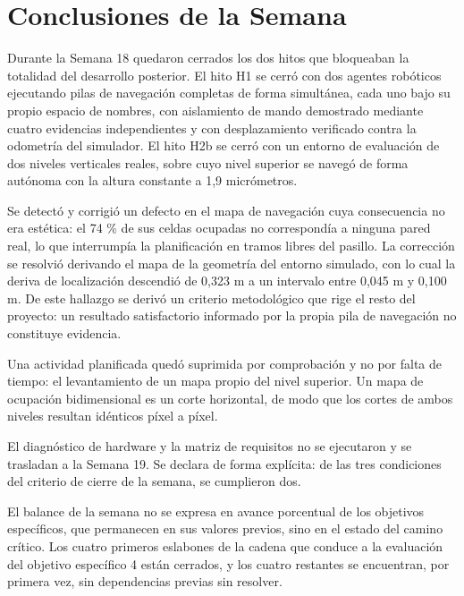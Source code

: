 \documentclass[12pt,letterpaper]{article}
\begin{document}
\section{Conclusiones de la Semana}

Durante la Semana 18 quedaron cerrados los dos hitos que bloqueaban la totalidad del desarrollo posterior. El hito H1 se cerró con dos agentes robóticos ejecutando pilas de navegación completas de forma simultánea, cada uno bajo su propio espacio de nombres, con aislamiento de mando demostrado mediante cuatro evidencias independientes y con desplazamiento verificado contra la odometría del simulador. El hito H2b se cerró con un entorno de evaluación de dos niveles verticales reales, sobre cuyo nivel superior se navegó de forma autónoma con la altura constante a 1,9 micrómetros.

Se detectó y corrigió un defecto en el mapa de navegación cuya consecuencia no era estética: el 74 \% de sus celdas ocupadas no correspondía a ninguna pared real, lo que interrumpía la planificación en tramos libres del pasillo. La corrección se resolvió derivando el mapa de la geometría del entorno simulado, con lo cual la deriva de localización descendió de 0,323 m a un intervalo entre 0,045 m y 0,100 m. De este hallazgo se derivó un criterio metodológico que rige el resto del proyecto: un resultado satisfactorio informado por la propia pila de navegación no constituye evidencia.

Una actividad planificada quedó suprimida por comprobación y no por falta de tiempo: el levantamiento de un mapa propio del nivel superior. Un mapa de ocupación bidimensional es un corte horizontal, de modo que los cortes de ambos niveles resultan idénticos píxel a píxel.

El diagnóstico de hardware y la matriz de requisitos no se ejecutaron y se trasladan a la Semana 19. Se declara de forma explícita: de las tres condiciones del criterio de cierre de la semana, se cumplieron dos.

El balance de la semana no se expresa en avance porcentual de los objetivos específicos, que permanecen en sus valores previos, sino en el estado del camino crítico. Los cuatro primeros eslabones de la cadena que conduce a la evaluación del objetivo específico 4 están cerrados, y los cuatro restantes se encuentran, por primera vez, sin dependencias previas sin resolver.
\end{document}
